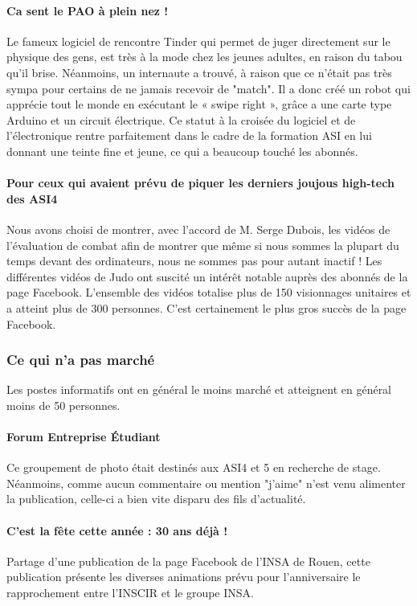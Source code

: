 \paragraph{Ca sent le PAO à plein nez !}
Le fameux logiciel de rencontre Tinder qui permet de juger directement sur le physique des gens, est très à la mode chez les jeunes adultes, en raison du tabou qu'il brise. Néanmoins, un internaute a trouvé, à raison que ce n'était pas très sympa pour certains de ne jamais recevoir de "match". Il a donc créé un robot qui apprécie tout le monde en exécutant le « swipe right », grâce a une carte type Arduino et un circuit électrique. Ce statut à la croisée du logiciel et de l'électronique rentre parfaitement dans le cadre de la formation ASI en lui donnant une teinte fine et jeune, ce qui a beaucoup touché les abonnés.


\paragraph{Pour ceux qui avaient prévu de piquer les derniers joujous high-tech des ASI4 }
Nous avons choisi de montrer, avec l'accord de M. Serge Dubois, les vidéos de l'évaluation de combat afin de montrer que même si nous sommes la plupart du temps devant des ordinateurs, nous ne sommes pas pour autant inactif !
Les différentes vidéos de Judo ont suscité un intérêt notable auprès des abonnés de la page Facebook. L'ensemble des vidéos totalise plus de 150 visionnages unitaires et a atteint plus de 300 personnes. C'est certainement le plus gros succès de la page Facebook.


\subsubsection{Ce qui n'a pas marché}
Les postes informatifs ont en général le moins marché et atteignent en général moins de 50 personnes.

\paragraph{Forum Entreprise Étudiant}
Ce groupement de photo était destinés aux ASI4 et 5 en recherche de stage. Néanmoins, comme aucun commentaire ou mention "j'aime" n'est venu alimenter la publication, celle-ci a bien vite disparu des fils d'actualité.

\paragraph{C'est la fête cette année : 30 ans déjà !}
Partage d'une publication de la page Facebook de l'INSA de Rouen, cette publication présente les diverses animations prévu pour l'anniversaire le rapprochement entre l'INSCIR et le groupe INSA.

